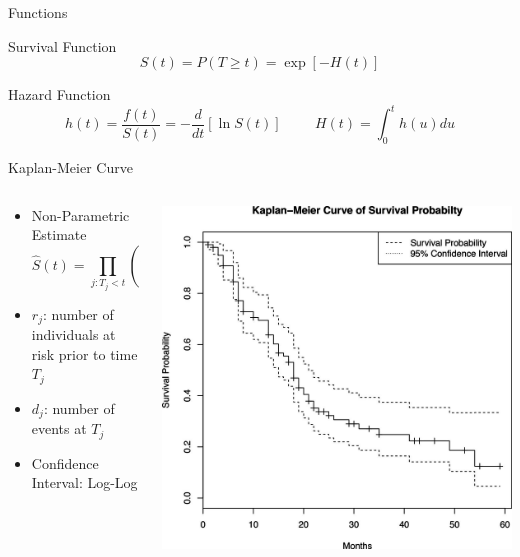\documentclass{beamer}
\begin{document}
\begin{frame}{Functions}
\begin{block}{Survival Function}
    \begin{equation*}
        S(t) = P(T \geq t) = \exp[-H(t)]
    \end{equation*}
\end{block}

\begin{block}{Hazard Function}
    \begin{equation*}
        h(t) = \frac{f(t)}{S(t)} = -\frac{d}{dt}[\ln S(t)] \hspace{1cm} H(t) = \int^t_0 h(u) du
    \end{equation*}
\end{block}
\cite{ReddyLi}
\end{frame}

\begin{frame}{Kaplan-Meier Curve}
\begin{columns}
    \begin{column}{0.49\textwidth}
    \begin{itemize}
        \item Non-Parametric Estimate
        \begin{equation*}
        \hat{S}(t) = \prod_{j:T_j<t} \left(1-\frac{d_j}{r_j}\right) 
        \end{equation*}
        \item $r_j$: number of individuals at risk prior to time $T_j$
        \item $d_j$: number of events at $T_j$
        \item Confidence Interval: Log-Log
    \end{itemize}
    
    \end{column}
    \begin{column}{0.49\textwidth}
        \includegraphics[width = \textwidth]{images/kmc.png}
    \end{column}
\end{columns}
\end{frame}
\end{document}
